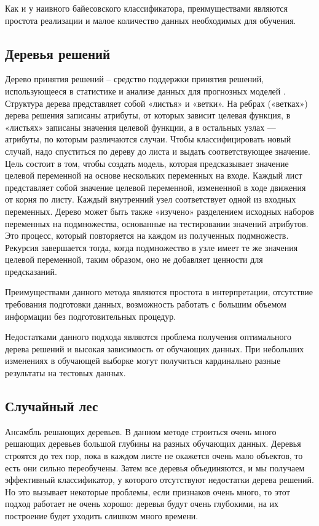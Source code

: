 \documentclass[a4paper,14pt, unknownkeysallowed]{extreport}
\begin{document}
	Как и у наивного байесовского классификатора, преимуществами являются простота реализации и малое количество данных необходимых для обучения.
	
	\subsection{Деревья решений}
	
	Дерево принятия решений -- средство поддержки принятия решений, использующееся в статистике и анализе данных для прогнозных моделей \cite{Noskov}. Структура дерева представляет собой «листья» и «ветки». На ребрах («ветках») дерева решения записаны атрибуты, от которых зависит целевая функция, в «листьях» записаны значения целевой функции, а в остальных узлах — атрибуты, по которым различаются случаи. Чтобы классифицировать новый случай, надо спуститься по дереву до листа и выдать соответствующее значение. Цель состоит в том, чтобы создать модель, которая предсказывает значение целевой переменной на основе нескольких переменных на входе. Каждый лист представляет собой значение целевой переменной, измененной в ходе движения от корня по листу. Каждый внутренний узел соответствует одной из входных переменных. Дерево может быть также «изучено» разделением исходных наборов переменных на подмножества, основанные на тестировании значений атрибутов. Это процесс, который повторяется на каждом из полученных подмножеств. Рекурсия завершается тогда, когда подмножество в узле имеет те же значения целевой переменной, таким образом, оно не добавляет ценности для предсказаний.
	
	Преимуществами данного метода являются простота в интерпретации, отсутствие требования подготовки данных, возможность работать с большим объемом информации без подготовительных процедур.
	
	Недостатками данного подхода являются  проблема получения оптимального дерева решений и высокая зависимость от обучающих данных. При небольших изменениях в обучающей выборке могут получиться кардинально разные результаты на тестовых данных.
	
	\subsection{Случайный лес}
	
	Ансамбль решающих деревьев. В данном методе строиться очень много решающих деревьев большой глубины на разных обучающих данных. Деревья строятся до тех пор, пока в каждом листе не окажется очень мало объектов, то есть они сильно переобучены.
	Затем все деревья объединяются, и мы получаем эффективный классификатор, у которого отсутствуют недостатки дерева решений. Но это вызывает некоторые проблемы, если признаков очень много, то этот подход работает не очень хорошо: деревья будут очень глубокими, на их построение будет уходить слишком много времени.
	
\end{document}
